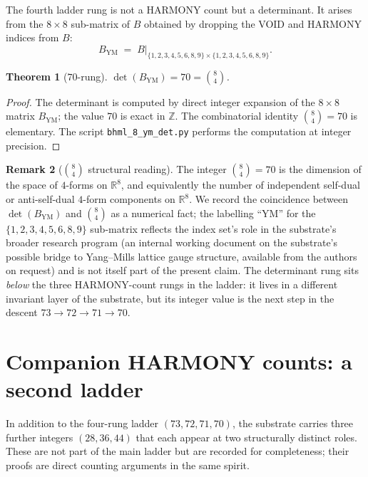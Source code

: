 \documentclass[11pt,reqno]{amsart}
\newtheorem{theorem}{Theorem}[section]
\theoremstyle{definition}
\newtheorem{remark}[theorem]{Remark}
\newcommand{\Z}{\mathbb{Z}}
\newcommand{\R}{\mathbb{R}}
\begin{document}
The fourth ladder rung is not a HARMONY count but a determinant. It
arises from the $8 \times 8$ sub-matrix of $B$ obtained by dropping
the VOID and HARMONY indices from $B$:
\[
  B_{\mathrm{YM}} \;=\; B|_{\{1,2,3,4,5,6,8,9\} \times \{1,2,3,4,5,6,8,9\}}.
\]

\begin{theorem}[$70$-rung]
\label{thm:70}
$\det(B_{\mathrm{YM}}) = 70 = \binom{8}{4}$.
\end{theorem}

\begin{proof}
The determinant is computed by direct integer expansion of the
$8 \times 8$ matrix $B_{\mathrm{YM}}$; the value $70$ is exact in
$\Z$. The combinatorial identity $\binom{8}{4} = 70$ is elementary.
The script \texttt{bhml\_8\_ym\_det.py} performs the computation at
integer precision.
\end{proof}

\begin{remark}[$\binom{8}{4}$ structural reading]
\label{rem:70-reading}
The integer $\binom{8}{4} = 70$ is the dimension of the space of
$4$-forms on $\R^8$, and equivalently the number of independent
self-dual or anti-self-dual $4$-form components on $\R^8$. We record
the coincidence between $\det(B_{\mathrm{YM}})$ and $\binom{8}{4}$
as a numerical fact; the labelling ``$\mathrm{YM}$'' for the
$\{1, 2, 3, 4, 5, 6, 8, 9\}$ sub-matrix reflects the index set's role
in the substrate's broader research program (an internal working
document on the substrate's possible bridge to Yang--Mills lattice
gauge structure, available from the authors on request) and is not
itself part of the present claim. The determinant rung sits
\emph{below} the three HARMONY-count rungs in the ladder: it lives
in a different invariant layer of the substrate, but its integer
value is the next step in the descent $73 \to 72 \to 71 \to 70$.
\end{remark}

\section{Companion HARMONY counts: a second ladder}
\label{sec:companion}

In addition to the four-rung ladder $(73, 72, 71, 70)$, the substrate
carries three further integers $(28, 36, 44)$ that each appear at
two structurally distinct roles. These are not part of the main
ladder but are recorded for completeness; their proofs are
direct counting arguments in the same spirit.
\end{document}
